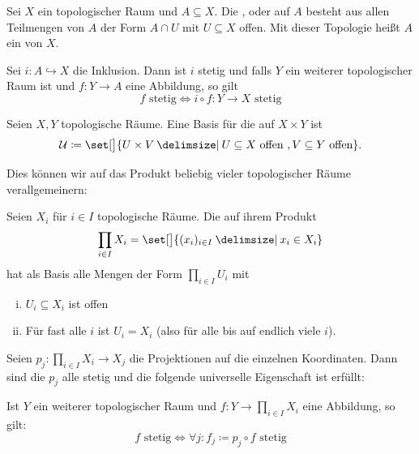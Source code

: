 \begin{definition}[{name=[Teilraumtopologie]}]
	Sei $X$ ein topologischer Raum und $A \subseteq X$.
	Die ,  oder  auf $A$ besteht aus allen Teilmengen von $A$ der Form $A \cap U$ mit $U \subseteq X$ offen.
	Mit dieser Topologie heißt $A$ ein  von $X$.
\end{definition}

\begin{bemerkung}[{name=[Eigenschaften der Inklusion]}]
	Sei $i \colon A \hookrightarrow X$ die Inklusion.
	Dann ist $i$ stetig und falls $Y$ ein weiterer topologischer Raum ist und $f \colon Y \to A$ eine Abbildung, so gilt
	\[
		f \text{ stetig} \iff i \circ  f \colon Y \to X \text{ stetig}
	\]
\end{bemerkung}

\begin{definition}[{name=[Produkttopologie]}]
	Seien $X,Y$ topologische Räume.
	Eine Basis für die  auf $X \times Y$ ist
	\[
		\mathcal{U} \coloneqq \set[\big]{U \times V \given U \subseteq X \text{ offen }, V \subseteq Y \text{ offen}}.
	\]
\end{definition}

Dies können wir auf das Produkt beliebig vieler topologischer Räume verallgemeinern:

\begin{definition}[{name=[Produkttopologie]}]
	Seien $X_i$ für $i \in I$ topologische Räume. Die  auf ihrem Produkt
	\[
		\prod_{i \in I} X_i = \set[\big]{(x_i)_{i \in I} \given x_i \in X_i}
	\]
	hat als Basis alle Mengen der Form $\prod_{i \in I} U_i$ mit
	\begin{enumerate}[(i)]
		\item $U_i \subseteq X_i$ ist offen
		\item Für fast alle $i$ ist $U_i = X_i$ (also für alle bis auf endlich viele $i$).
	\end{enumerate}
\end{definition}

\begin{bemerkung}[{name=[universelle Eigenschaft der Produkttopologie]}]
	Seien $p_j \colon \prod_{i \in I} X_i \to X_j$ die Projektionen auf die einzelnen Koordinaten.
	Dann sind die $p_j$ alle stetig und die folgende universelle Eigenschaft ist erfüllt:

	Ist $Y$ ein weiterer topologischer Raum und $f \colon Y \to \prod_{i \in I} X_i$ eine Abbildung, so gilt:
	\[
		f \text{ stetig} \iff \forall j : f_j \coloneqq  p_j \circ f \text{ stetig}
	\]
\end{bemerkung}

